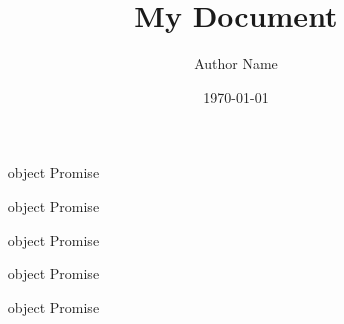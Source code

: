 \documentclass{article}
\title{My Document}\author{Author Name}\date{\today}
\begin{document}
\begin{enumerate}
\item [object Promise]
\end{enumerate}\begin{enumerate}
\item [object Promise]
\end{enumerate}\begin{enumerate}
\item [object Promise]
\end{enumerate}\begin{enumerate}
\item [object Promise]\item [object Promise]
\end{enumerate}
\end{document}
